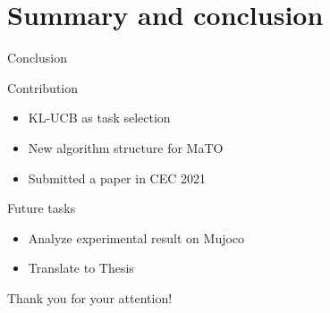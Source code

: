 \section*{Summary and conclusion}

\begin{frame}{Conclusion}
    \begin{block}{Contribution}
        \begin{itemize}
            \item KL-UCB as task selection
            \item New algorithm structure for MaTO
            \item Submitted a paper in CEC 2021
        \end{itemize}
    \end{block}
    \begin{block}{Future tasks}
        \begin{itemize}
            \item Analyze experimental result on Mujoco
            \item Translate to Thesis
        \end{itemize}
    \end{block}
\end{frame}

\begin{frame}{}
    \centering \Huge Thank you for your attention!
\end{frame}